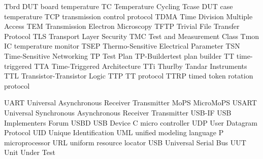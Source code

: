 			{Tbrd}		{DUT board temperature}
			{TC}		{Temperature Cycling}
		{Tcase}		{DUT case temperature}
		{TCP}		{transmission control protocol}
		{TDMA}		{Time Division Multiple Access}
		{TEM}		{Transmission Electron Microscopy}
		{TFTP}		{Trivial File Transfer Protocol}
		{TLS}		{Transport Layer Security}
		{TMC}		{Test and Measurement Class}
		{Tmon}		{IC temperature monitor}
		{TSEP}		{Thermo-Sensitive Electrical Parameter}
		{TSN}		{Time-Sensitive Networking}
			{TP}		{Test Plan}
		{TP-Builder}{test plan builder}
			{TT}		{time-triggered}
		{TTA}		{Time-Triggered Architecture}
		{TTi}		{Thurlby Tandar Instruments}
		{TTL}		{Transistor-Transistor Logic}
		{TTP}		{{\acrlong{TT}} protocol}
		{TTRP}		{timed token rotation protocol}

		{UART}		{Universal Asynchronous Receiver Transmitter}
		{\textmu{}MoPS} {MicroMoPS}
		{USART}		{Universal Synchronous Asynchronous Receiver Transmitter}
		{USB-IF}	{USB Implementers Forum}
		{USBD}		{USB Device}
			{\textmu{}C}	{micro controller}
		{UDP}		{User Datagram Protocol}
		{UID}		{Unique Identification}
		{UML}		{unified modeling language}
			{\textmu{}P}	{microprocessor}
		{URL}		{uniform resource locator}
		{USB}		{Universal Serial Bus}
		{UUT}		{Unit Under Test}

